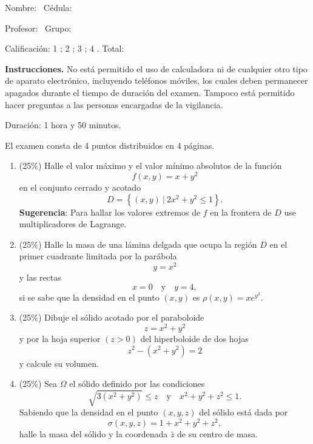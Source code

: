 \documentclass[11pt]{article}
\begin{document}
\examheader

\vspace{4pt}
\noindent Nombre: \dotfill\ Cédula: \dotfill

\vspace{4pt}
\noindent Profesor: \dotfill\ Grupo: \dotfill

\vspace{4pt}
\noindent Calificación: 1 \dotfill; 2 \dotfill; 3 \dotfill; 4 \dotfill. Total: \dotfill

\vspace{6pt}
\noindent\textbf{Instrucciones.} No está permitido el uso de calculadora ni de cualquier otro tipo de aparato electrónico, incluyendo teléfonos móviles, los cuales deben permanecer apagados durante el tiempo de duración del examen. Tampoco está permitido hacer preguntas a las personas encargadas de la vigilancia.

\vspace{6pt}
\noindent Duración: 1 hora y 50 minutos.

\vspace{4pt}
\noindent El examen consta de 4 puntos distribuidos en 4 páginas.

\begin{enumerate}
\item{} (25\%) Halle el valor máximo y el valor mínimo absolutos de la función
\[
f(x,y) = x+y^2
\]
en el conjunto cerrado y acotado
\[
D = \left\{(x,y)\ |\ 2x^2+y^2\leq 1\right\}.
\]
\noindent \textbf{Sugerencia}: Para hallar los valores extremos de $f$ en la frontera de $D$ use multiplicadores de Lagrange.

\newpage
\item{} (25\%) Halle la masa de una lámina delgada que ocupa la región $D$ en el primer cuadrante limitada por la parábola
\[
y = x^2
\]
y las rectas
\[
x=0 \quad \text{y} \quad y=4,
\]
si se sabe que la densidad en el punto $(x,y)$ es $\rho(x,y)=xe^{y^2}$.

\newpage
\item{} (25\%) Dibuje el sólido acotado por el paraboloide
\[
z = x^2+y^2
\]
y por la hoja superior $(z>0)$ del hiperboloide de dos hojas
\[
z^2-(x^2+y^2)=2
\]
y calcule su volumen.

\newpage
\item{} (25\%) Sea $\Omega$ el sólido definido por las condiciones
\[
\sqrt{3(x^2+y^2)}\leq z \quad \text{y} \quad x^2+y^2+z^2\leq 1.
\]
\noindent Sabiendo que la densidad en el punto $(x,y,z)$ del sólido está dada por
\[
\sigma(x,y,z) = 1+x^2+y^2+z^2,
\]
halle la masa del sólido y la coordenada $\bar{z}$ de su centro de masa.
\end{enumerate}

\examfooter
\end{document}
